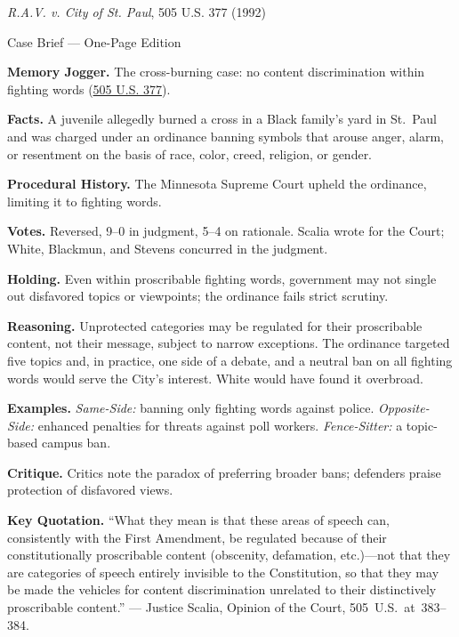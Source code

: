 \documentclass[12pt]{article}
\begin{document}
\begin{center}
{\Large \textit{R.A.V. v. City of St. Paul}, 505 U.S. 377 (1992)\par}
\vspace{0.3em}
{\normalsize Case Brief --- One-Page Edition\par}
\end{center}

\textbf{Memory Jogger.} The cross-burning case: no content discrimination within fighting words (\href{https://supreme.justia.com/cases/federal/us/505/377/}{505 U.S. 377}).

\textbf{Facts.} A juvenile allegedly burned a cross in a Black family's yard in St.~Paul and was charged under an ordinance banning symbols that arouse anger, alarm, or resentment on the basis of race, color, creed, religion, or gender.

\textbf{Procedural History.} The Minnesota Supreme Court upheld the ordinance, limiting it to fighting words.

\textbf{Votes.} Reversed, 9--0 in judgment, 5--4 on rationale. Scalia wrote for the Court; White, Blackmun, and Stevens concurred in the judgment.

\textbf{Holding.} Even within proscribable fighting words, government may not single out disfavored topics or viewpoints; the ordinance fails strict scrutiny.

\textbf{Reasoning.} Unprotected categories may be regulated for their proscribable content, not their message, subject to narrow exceptions. The ordinance targeted five topics and, in practice, one side of a debate, and a neutral ban on all fighting words would serve the City's interest. White would have found it overbroad.

\textbf{Examples.} \emph{Same-Side:} banning only fighting words against police. \emph{Opposite-Side:} enhanced penalties for threats against poll workers. \emph{Fence-Sitter:} a topic-based campus ban.

\textbf{Critique.} Critics note the paradox of preferring broader bans; defenders praise protection of disfavored views.

\textbf{Key Quotation.} ``What they mean is that these areas of speech can, consistently with the First Amendment, be regulated because of their constitutionally proscribable content (obscenity, defamation, etc.)---not that they are categories of speech entirely invisible to the Constitution, so that they may be made the vehicles for content discrimination unrelated to their distinctively proscribable content.'' --- Justice Scalia, Opinion of the Court, 505~U.S.~at~383--384.
\end{document}
